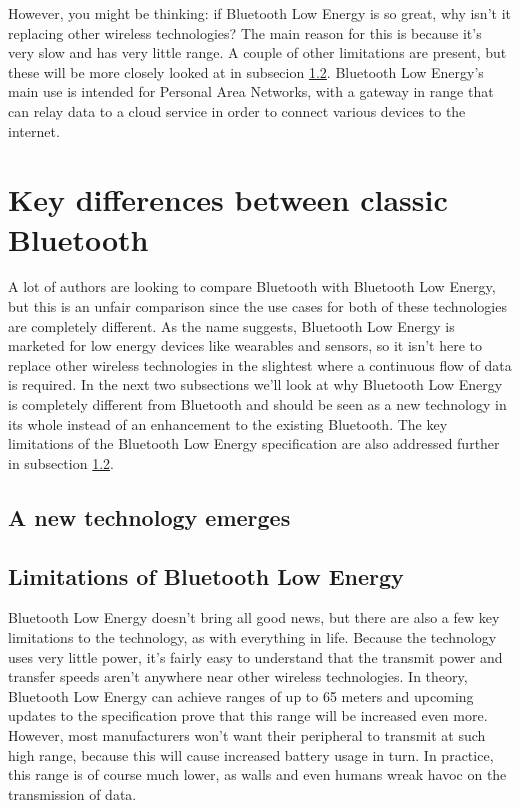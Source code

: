 \documentclass[pdftex,a4paper,12pt,twoside]{report}
\begin{document}
However, you might be thinking: if Bluetooth Low Energy is so great, why isn't it replacing other wireless technologies? The main reason for this is because it's very slow and has very little range. A couple of other limitations are present, but these will be more closely looked at in subsecion \ref{subsec:limitations}. Bluetooth Low Energy's main use is intended for Personal Area Networks, with a gateway in range that can relay data to a cloud service in order to connect various devices to the internet.

\section{Key differences between classic Bluetooth}
\label{sec:differencesclassic}
A lot of authors are looking to compare Bluetooth with Bluetooth Low Energy, but this is an unfair comparison since the use cases for both of these technologies are completely different. As the name suggests, Bluetooth Low Energy is marketed for low energy devices like wearables and sensors, so it isn't here to replace other wireless technologies in the slightest where a continuous flow of data is required. In the next two subsections we'll look at why Bluetooth Low Energy is completely different from Bluetooth and should be seen as a new technology in its whole instead of an enhancement to the existing Bluetooth. The key limitations of the Bluetooth Low Energy specification are also addressed further in subsection \ref{subsec:limitations}.

\subsection{A new technology emerges}
\label{subsec:newtechnology}

\subsection{Limitations of Bluetooth Low Energy}
\label{subsec:limitations}
Bluetooth Low Energy doesn't bring all good news, but there are also a few key limitations to the technology, as with everything in life. Because the technology uses very little power, it's fairly easy to understand that the transmit power and transfer speeds aren't anywhere near other wireless technologies. In theory, Bluetooth Low Energy can achieve ranges of up to 65 meters and upcoming updates to the specification prove that this range will be increased even more. However, most manufacturers won't want their peripheral to transmit at such high range, because this will cause increased battery usage in turn. In practice, this range is of course much lower, as walls and even humans wreak havoc on the transmission of data.
\end{document}
